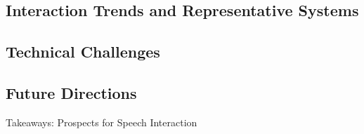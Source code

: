 
\subsection{Interaction Trends and Representative Systems}
\label{sec:interaction-trends-and-representative-systems}

\subsection{Technical Challenges}
\label{sec:technical-challenges}

\subsection{Future Directions}
\label{sec:future-directions}

\begin{TakeawayBox}{Takeaways: Prospects for Speech Interaction}
\end{TakeawayBox}

